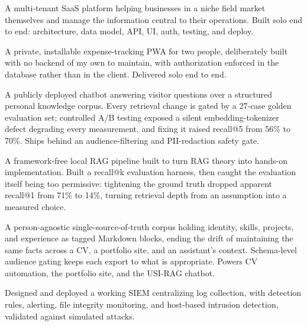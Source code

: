 \documentclass[10pt,a4paper]{article}
\newcommand{\cvproject}[3]{\needspace{4\baselineskip}\vspace{2pt}{\bfseries #1}\par\vspace{-4pt}{\itshape\small Tech stack: #2\par}\vspace{-4pt}#3\par}
\begin{document}
\cvproject{Niche-Field SaaS Marketing \& Admin Platform}{TypeScript · React · Express · PostgreSQL · Drizzle · Zod · Playwright · Vercel}{A multi-tenant SaaS platform helping businesses in a niche field market themselves and manage the information central to their operations. Built solo end to end: architecture, data model, API, UI, auth, testing, and deploy.}

\cvproject{Shared Expense Tracker (Serverless PWA)}{TypeScript · React · Supabase · PostgreSQL (RLS) · Google OAuth · Workbox}{A private, installable expense-tracking PWA for two people, deliberately built with no backend of my own to maintain, with authorization enforced in the database rather than in the client. Delivered solo end to end.}

\cvproject{USI-RAG: Production RAG Chatbot}{Python · LangChain · ChromaDB · Ollama · Docker Compose · Cloudflare Tunnel}{A publicly deployed chatbot answering visitor questions over a structured personal knowledge corpus. Every retrieval change is gated by a 27-case golden evaluation set; controlled A/B testing exposed a silent embedding-tokenizer defect degrading every measurement, and fixing it raised recall@5 from 56\% to 70\%. Ships behind an audience-filtering and PII-redaction safety gate.}

\cvproject{From-Scratch Local RAG Pipeline}{Python · Ollama · nomic-embed-text · numpy}{A framework-free local RAG pipeline built to turn RAG theory into hands-on implementation. Built a recall@k evaluation harness, then caught the evaluation itself being too permissive: tightening the ground truth dropped apparent recall@1 from 71\% to 14\%, turning retrieval depth from an assumption into a measured choice.}

\cvproject{USI: Unified Source of Information (Personal Knowledge Corpus)}{Python · YAML · Markdown}{A person-agnostic single-source-of-truth corpus holding identity, skills, projects, and experience as tagged Markdown blocks, ending the drift of maintaining the same facts across a CV, a portfolio site, and an assistant's context. Schema-level audience gating keeps each export to what is appropriate. Powers CV automation, the portfolio site, and the USI-RAG chatbot.}

\cvproject{SIEM Implementation: Security Monitoring \& Detection}{Wazuh · Elasticsearch · Logstash · Kibana · HIDS · FIM}{Designed and deployed a working SIEM centralizing log collection, with detection rules, alerting, file integrity monitoring, and host-based intrusion detection, validated against simulated attacks.}
\end{document}
